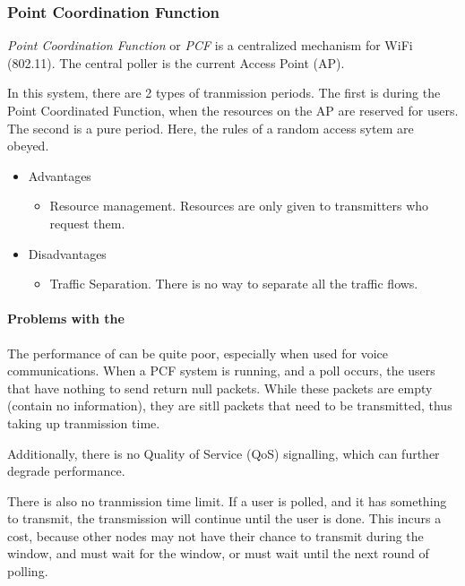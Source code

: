 \subsubsection{Point Coordination Function}\label{subsubsec:Point_Coordination_Function}
\begin{definition}\label{def:PCF}
  \emph{Point Coordination Function} or \emph{PCF} is a centralized  mechanism for WiFi (802.11).
  The central poller is the current Access Point (AP).

  In this system, there are 2 types of tranmission periods.
  The first is during the Point Coordinated Function, when the resources on the AP are reserved for users.
  The second is a pure  period.
  Here, the rules of a random access sytem are obeyed.

  \begin{itemize}[noitemsep]
  \item Advantages
    \begin{itemize}[noitemsep]
    \item Resource management. Resources are only given to transmitters who request them.
    \end{itemize}

  \item Disadvantages
    \begin{itemize}[noitemsep]
    \item Traffic Separation. There is no way to separate all the traffic flows.
    \end{itemize}
  \end{itemize}
\end{definition}

\paragraph{Problems with the }\label{par:PCF_Problems}
The performance of  can be quite poor, especially when used for voice communications.
When a PCF system is running, and a poll occurs, the users that have nothing to send return null packets.
While these packets are empty (contain no information), they are sitll packets that need to be transmitted, thus taking up tranmission time.

Additionally, there is no Quality of Service (QoS) signalling, which can further degrade performance.

There is also no tranmission time limit.
If a user is polled, and it has something to transmit, the transmission will continue until the user is done.
This incurs a cost, because other nodes may not have their chance to transmit during the  window, and must wait for the  window, or must wait until the next round of polling.

